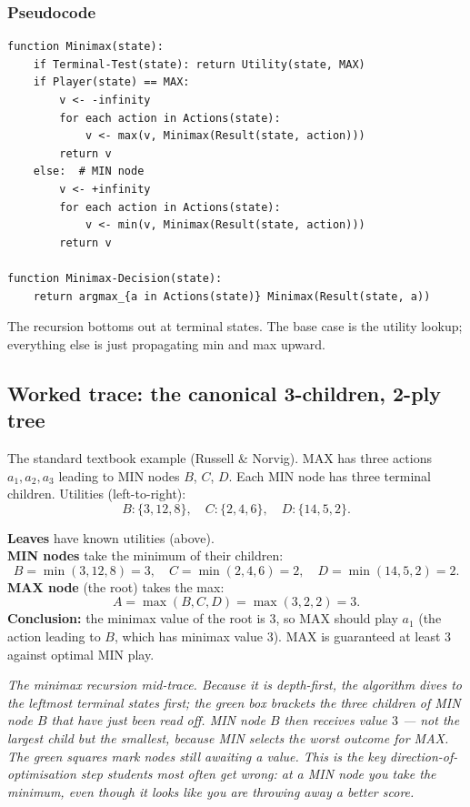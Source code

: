 \documentclass[11pt, a4paper]{article}
\begin{document}
\subsubsection*{Pseudocode}

\begin{exbox}
\begin{verbatim}
function Minimax(state):
    if Terminal-Test(state): return Utility(state, MAX)
    if Player(state) == MAX:
        v <- -infinity
        for each action in Actions(state):
            v <- max(v, Minimax(Result(state, action)))
        return v
    else:  # MIN node
        v <- +infinity
        for each action in Actions(state):
            v <- min(v, Minimax(Result(state, action)))
        return v

function Minimax-Decision(state):
    return argmax_{a in Actions(state)} Minimax(Result(state, a))
\end{verbatim}
\end{exbox}

The recursion bottoms out at terminal states. The base case is the utility lookup; everything else is just propagating min and max upward.

\subsection{Worked trace: the canonical 3-children, 2-ply tree}

The standard textbook example (Russell \& Norvig). MAX has three actions $a_1, a_2, a_3$ leading to MIN nodes $B$, $C$, $D$. Each MIN node has three terminal children. Utilities (left-to-right):
\[
B: \{3, 12, 8\}, \quad C: \{2, 4, 6\}, \quad D: \{14, 5, 2\}.
\]

\begin{exbox}
\textbf{Leaves} have known utilities (above).\\[0.3em]
\textbf{MIN nodes} take the minimum of their children:
\[
B = \min(3, 12, 8) = 3, \quad C = \min(2, 4, 6) = 2, \quad D = \min(14, 5, 2) = 2.
\]
\textbf{MAX node} (the root) takes the max:
\[
A = \max(B, C, D) = \max(3, 2, 2) = 3.
\]
\textbf{Conclusion:} the minimax value of the root is 3, so MAX should play $a_1$ (the action leading to $B$, which has minimax value 3). MAX is guaranteed at least 3 against optimal MIN play.
\end{exbox}

\begin{center}

\footnotesize\textit{The minimax recursion mid-trace. Because it is depth-first, the algorithm dives to the leftmost terminal states first; the green box brackets the three children of MIN node $B$ that have just been read off. MIN node $B$ then receives value $3$ --- \emph{not} the largest child but the smallest, because MIN selects the worst outcome for MAX. The green squares mark nodes still awaiting a value. This is the key direction-of-optimisation step students most often get wrong: at a MIN node you take the minimum, even though it looks like you are throwing away a better score.}
\end{center}
\end{document}
